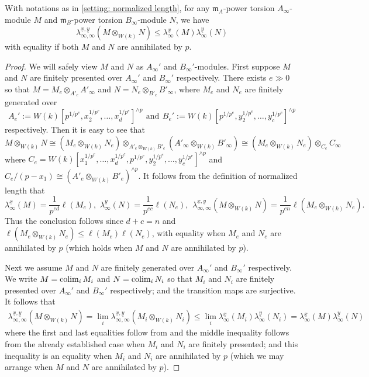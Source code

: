 \documentclass[12pt]{amsart}
\numberwithin{equation}{theorem}
\numberwithin{equation}{theorem}
\renewcommand{\m}{\mathfrak{m}}
\begin{document}
\begin{lemma}
\label{lem: chi_inftyinfty leq product of chi_infty}
With notations as in \autoref{setting: normalized length}, for any $\m_A$-power torsion $A_\infty$-module $M$ and $\m_B$-power torsion $B_\infty$-module $N$, we have
$$\lambda_{\infty,\infty}^{\underline{x},\underline{y}}(M \otimes_{W(k)} N) \leq \lambda_\infty^{\underline{x}}(M) \lambda_\infty^{\underline{y}}(N)$$
with equality if both $M$ and $N$ are annihilated by $p$. 
\end{lemma}
\begin{proof}
We will safely view $M$ and $N$ as $A_\infty'$ and $B_\infty'$-modules. First suppose $M$ and $N$ are finitely presented over $A_\infty'$ and $B_\infty'$ respectively. There exists $e\gg0$ so that $M=M_e \otimes_{A'_e}A'_\infty$ and $N=N_e\otimes_{B'_e}B'_\infty$, where $M_e$ and $N_e$ are finitely generated over 
$$A_e':=W(k)[p^{1/p^e},x_2^{1/p^e},\dots,x_d^{1/p^e}]^{\wedge p} \,\ \text{and} \,\ B_e':=W(k)[p^{1/p^e},y_2^{1/p^e},\dots,y_c^{1/p^e}]^{\wedge p}$$
respectively. Then it is easy to see that 
$$M\otimes_{W(k)}N\cong (M_e\otimes_{W(k)}N_e)\otimes_{A'_e\otimes_{W(k)}B'_e}(A'_\infty\otimes_{W(k)}B'_\infty) \cong (M_e\otimes_{W(k)}N_e)\otimes_{C_e}C_\infty$$
where $C_e=W(k)[x_1^{1/p^e},\dots,x_d^{1/p^e}, p^{1/p^e},y_2^{1/p^e},\dots,y_c^{1/p^e}]^{\wedge p}$ and $C_e/(p-x_1)\cong(A'_e\otimes_{W(k)}B'_e)^{\wedge p}$. It follows from the definition of normalized length that 
$$\lambda_\infty^{\underline{x}}(M)= \frac{1}{p^{ed}}\ell(M_e), \,\, \lambda_\infty^{\underline{y}}(N)= \frac{1}{p^{ec}}\ell(N_e), \,\ \lambda_{\infty,\infty}^{\underline{x},\underline{y}}(M\otimes_{W(k)}N)= \frac{1}{p^{en}}\ell(M_e\otimes_{W(k)}N_e).$$
Thus the conclusion follows since $d+c=n$ and $\ell(M_e\otimes_{W(k)}N_e) \leq \ell(M_e)\ell(N_e)$, 
with equality when $M_e$ and $N_e$ are annihilated by $p$ (which holds when $M$ and $N$ are annihilated by $p$).

Next we assume $M$ and $N$ are finitely generated over $A_\infty'$ and $B_\infty'$ respectively. We write $M=\operatorname{{colim}}_i M_i$ and $N=\operatorname{{colim}}_i N_i$ so that $M_i$ and $N_i$ are finitely presented over $A_\infty'$ and $B_\infty'$ respectively; and the transition maps are surjective. It follows that 
\begin{align*}
\lambda_{\infty,\infty}^{\underline{x},\underline{y}}(M\otimes_{W(k)}N) = \lim_i \lambda_{\infty,\infty}^{\underline{x},\underline{y}}(M_i \otimes_{W(k)} N_i) \leq \lim_i \lambda_\infty^{\underline{x}}(M_i)\lambda_\infty^{\underline{y}}(N_i) = \lambda_\infty^{\underline{x}}(M)\lambda_\infty^{\underline{y}}(N)
\end{align*}
where the first and last equalities follow from \cite[Proposition 2.2.6 (b)]{CaiLeeMaSchwedeTuckerPerfdSignature2026} and the middle inequality follows from the already established case when $M_i$ and $N_i$ are finitely presented; and this inequality is an equality when $M_i$ and $N_i$ are annihilated by $p$ (which we may arrange when $M$ and $N$ are annihilated by $p$). 


\end{proof}
\end{document}
